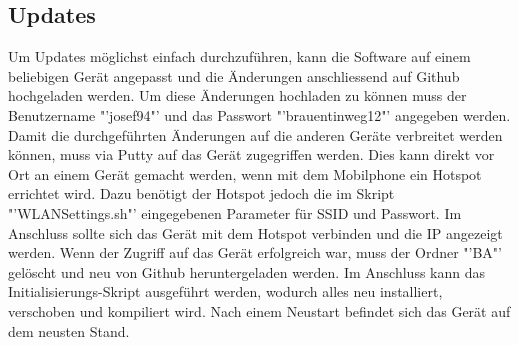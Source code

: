 \subsection{Updates}
Um Updates möglichst einfach durchzuführen, kann die Software auf einem beliebigen Gerät angepasst und die Änderungen anschliessend auf Github hochgeladen werden. Um diese Änderungen hochladen zu können muss der Benutzername "'josef94"' und das Passwort "'brauentinweg12"' angegeben werden.
Damit die durchgeführten Änderungen auf die anderen Geräte verbreitet werden können, muss via Putty auf das Gerät zugegriffen werden. Dies kann direkt vor Ort an einem Gerät gemacht werden, wenn mit dem Mobilphone ein Hotspot errichtet wird. Dazu benötigt der Hotspot jedoch die im Skript "'WLANSettings.sh"' eingegebenen Parameter für SSID und Passwort. Im Anschluss sollte sich das Gerät mit dem Hotspot verbinden und die IP angezeigt werden. Wenn der Zugriff auf das Gerät erfolgreich war, muss der Ordner "'BA"' gelöscht und neu von Github heruntergeladen werden. Im Anschluss kann das Initialisierungs-Skript ausgeführt werden, wodurch alles neu installiert, verschoben und kompiliert wird. Nach einem Neustart befindet sich das Gerät auf dem neusten Stand.